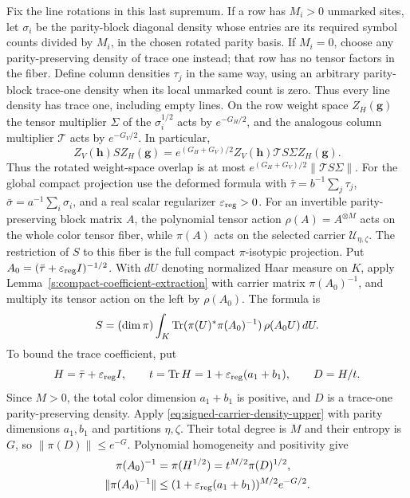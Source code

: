 Fix the line rotations in this last supremum. If a row has
$M_i>0$ unmarked sites,
let $\sigma_i$ be the parity-block diagonal density whose entries
are its required symbol counts divided by $M_i$, in the chosen
rotated parity basis. If $M_i=0$,
choose any parity-preserving density of trace one instead; that row
has no tensor factors in the fiber.  Define column densities
$\tau_j$ in the same way, using an arbitrary parity-block trace-one
density when its local unmarked count is zero.
Thus every line density has trace one, including empty lines.
On the row weight space $Z_H(\mathbf g)$ the tensor multiplier $\Sigma$ of the
$\sigma_i^{1/2}$ acts by $e^{-G_H/2}$, and the analogous column
multiplier $\mathcal T$ acts by $e^{-G_V/2}$. In particular,
\[
 Z_V(\mathbf h)S Z_H(\mathbf g)
 =e^{(G_H+G_V)/2}
   Z_V(\mathbf h)\mathcal T S\Sigma Z_H(\mathbf g).
\]
Thus the rotated weight-space overlap is at most
$e^{(G_H+G_V)/2}\|\mathcal T S\Sigma\|$.
For the global compact projection use the deformed formula
with $\bar\tau=b^{-1}\sum_j\tau_j$,
$\bar\sigma=a^{-1}\sum_i\sigma_i$, and a real scalar regularizer
$\varepsilon_{\rm reg}>0$.  For an invertible parity-preserving block
matrix $A$, the polynomial tensor action
$\rho(A)=A^{\otimes M}$ acts on the whole color tensor fiber, while
$\pi(A)$ acts on the selected carrier $\mathcal U_{\eta,\zeta}$.
The restriction of $S$ to this fiber is the full compact
$\pi$-isotypic projection. Put
$A_0=(\bar\tau+\varepsilon_{\rm reg}I)^{-1/2}$.
With $dU$ denoting normalized Haar measure
on $K$, apply Lemma~\ref{s:compact-coefficient-extraction} with carrier
matrix $\pi(A_0)^{-1}$, and multiply its tensor action on the left by
$\rho(A_0)$. The formula is
\[
 \begin{gathered}
 S=(\dim\pi)\int_K
 \operatorname{Tr}(\pi(U)^*\pi(A_0)^{-1})\,\rho(A_0U)\,dU.
 \end{gathered}
\]
To bound the trace coefficient, put
\[
 H=\bar\tau+\varepsilon_{\rm reg}I,\qquad
 t=\operatorname{Tr}H=1+\varepsilon_{\rm reg}(a_1+b_1),\qquad
 D=H/t.
\]
Since $M>0$, the total color dimension $a_1+b_1$ is positive,
and $D$ is a trace-one parity-preserving density. Apply
\eqref{eq:signed-carrier-density-upper} with parity dimensions
$a_1,b_1$ and partitions $\eta,\zeta$. Their total degree is $M$
and their entropy is $G$, so $\|\pi(D)\|\le e^{-G}$.
Polynomial homogeneity and positivity give
\[
 \begin{aligned}
 \pi(A_0)^{-1}&=\pi(H^{1/2})=t^{M/2}\pi(D)^{1/2},\\
 \|\pi(A_0)^{-1}\|
       &\le(1+\varepsilon_{\rm reg}(a_1+b_1))^{M/2}e^{-G/2}.
 \end{aligned}
\]
